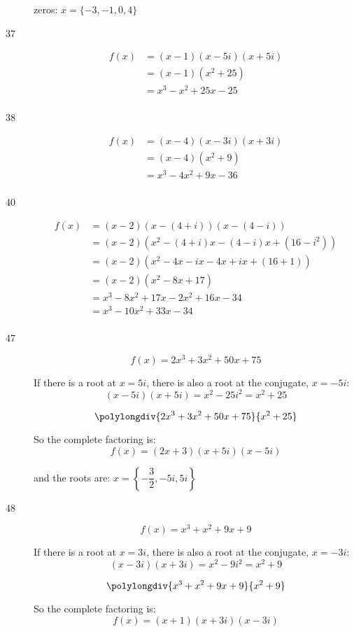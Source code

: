 \documentclass[fleqn,addpoints]{exam}
\begin{document}
\begin{description}
zeros: $x = \{ -3, -1, 0, 4 \}$

\item[37]
\begin{align*}
  f(x) &= (x-1)(x-5i)(x+5i) \\
  &= (x-1)(x^2+25) \\
  &= x^3 -x^2 + 25x - 25 \\
\end{align*}

\item[38]
\begin{align*}
  f(x) &= (x-4)(x-3i)(x+3i) \\
  &= (x-4)(x^2+9) \\
  &= x^3 -4x^2 + 9x - 36 \\
\end{align*}

\item[40]
\begin{align*}
  f(x) &= (x-2)(x- (4+i) )(x - (4-i)) \\
   &= (x-2)(x^2 - (4+i)x -(4-i)x + (16-i^2)) \\
   &= (x-2)(x^2 - 4x -ix -4x +ix + (16+1)) \\
   &= (x-2)(x^2 - 8x + 17) \\
   &= x^3 -8x^2 + 17x -2x^2 + 16x -34 \\
   &= x^3 -10x^2 + 33x -34 \\
\end{align*}

\item[47]
\[
  f(x) = 2x^3 + 3x^2 + 50x + 75
\]

If there is a root at $x=5i$, there is also a root at the conjugate, $x=-5i$:
\[
  (x-5i)(x+5i) = x^2-25i^2 = x^2+25
\]

\[ 
  \polylongdiv{2x^3 + 3x^2 + 50x + 75}{x^2+25} 
\]

So the complete factoring is:
\[
  f(x) = (2x+3)(x+5i)(x-5i)
\]

and the roots are: $x = \left \{ -\dfrac{3}{2}, -5i, 5i \right\}$

\item[48]
\[
  f(x) = x^3 + x^2 + 9x + 9
\]

If there is a root at $x=3i$, there is also a root at the conjugate, $x=-3i$:
\[
  (x-3i)(x+3i) = x^2-9i^2 = x^2+9
\]

\[ 
  \polylongdiv{ x^3 + x^2 + 9x + 9}{x^2+9} 
\]

So the complete factoring is:
\[
  f(x) = (x+1)(x+3i)(x-3i)
\]


\end{description}
\end{document}
